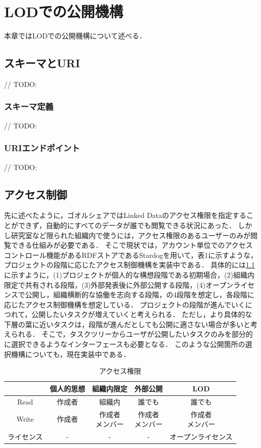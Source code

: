 \chapter{LODでの公開機構}
本章ではLODでの公開機構について述べる．

\section{スキーマとURI}
// TODO:

\subsection{スキーマ定義}
// TODO:

\subsection{URIエンドポイント}
// TODO:

\section{アクセス制御}
先に述べたように，ゴオルシェアではLinked Dataのアクセス権限を指定することができず，自動的にすべてのデータが誰でも閲覧できる状況にあった．
しかし研究室など限られた組織内で使うには，アクセス権限のあるユーザーのみが閲覧できる仕組みが必要である．
そこで現状では，アカウント単位でのアクセスコントロール機能があるRDFストアであるStardogを用いて，表1に示すような，プロジェクトの段階に応じたアクセス制御機構を実装中である．
具体的には\ref{table:permission_table}に示すように，(1)プロジェクトが個人的な構想段階である初期場合，(2)組織内限定で共有される段階，(3)外部発表後に外部公開する段階，(4)オープンライセンスで公開し，組織横断的な協働を志向する段階，の4段階を想定し，各段階に応じたアクセス制御機構を想定している．
プロジェクトの段階が進んでいくにつれて，公開したいタスクが増えていくと考えられる．
ただし，より具体的な下層の葉に近いタスクは，段階が進んだとしても公開に適さない場合が多いと考えられる．
そこで，タスクツリーからユーザが公開したいタスクのみを部分的に選択できるようなインターフェースも必要となる．
このような公開箇所の選択機構についても，現在実装中である．

\begin{table}[t]
 \caption{アクセス権限}
 \begin{center}
	 \begin{tabular}{ | c || c | c | c | c | } \hline
		  & 個人的思想 & 組織内限定 & 外部公開 & LOD \\ \hline \hline
			Read & 作成者 & 組織内 & 誰でも & 誰でも \\ \hline
			Write & 作成者 & \shortstack{ 作成者 \\ メンバー } & \shortstack{ 作成者 \\ メンバー } & \shortstack{ 作成者 \\ メンバー } \\ \hline
			ライセンス & - & - & - & オープンライセンス \\ \hline
	 \end{tabular}
	 \label{table:permission_table}
 \end{center}
\end{table}

